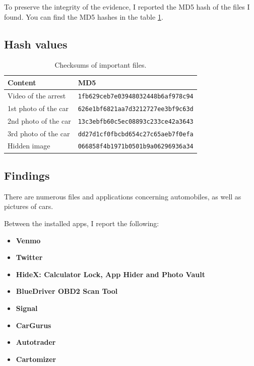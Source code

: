 \documentclass[12pt]{article}
\begin{document}
To preserve the integrity of the evidence, I reported the MD5 hash of the files I found. You can find the MD5 hashes in the table \ref{table:hashes}.

\subsection{Hash values}

\begin{table}[!ht]
    \centering
    \begin{tabular}{ll}
    \toprule
    \textbf{Content} & \textbf{MD5} \\
    \midrule
    Video of the arrest & \texttt{1fb629ceb7e03948032448b6af978c94} \\
    1st photo of the car & \texttt{626e1bf6821aa7d3212727ee3bf9c63d} \\
    2nd photo of the car & \texttt{13c3ebfb60c5ec08893c233ce42a3643} \\
    3rd photo of the car & \texttt{dd27d1cf0fbcbd654c27c65aeb7f0efa} \\
    Hidden image & \texttt{066858f4b1971b0501b9a06296936a34} \\
    \bottomrule
    \end{tabular}
    \caption{Checksums of important files.}
    \label{table:hashes}
\end{table}

\subsection{Findings}

There are numerous files and applications concerning automobiles, as well as pictures of cars. 

Between the installed apps, I report the following:
\begin{itemize}
    \item \textbf{Venmo} \cite{venmo}
    \item \textbf{Twitter}
    \item \textbf{HideX: Calculator Lock, App Hider and Photo Vault} \cite{calculator} 
    \item \textbf{BlueDriver OBD2 Scan Tool} \cite{blue-driver}
    \item \textbf{Signal} \cite{signal} 
    \item \textbf{CarGurus}
    \item \textbf{Autotrader}
    \item \textbf{Cartomizer}
\end{itemize}
\end{document}
